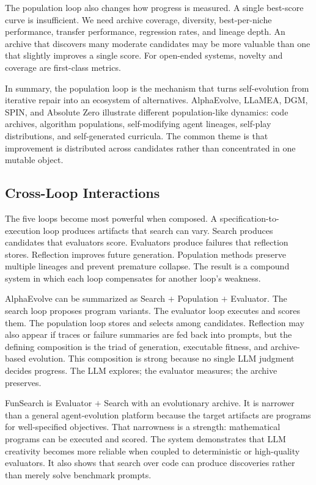 The population loop also changes how progress is measured.  A single best-score curve is insufficient.  We need archive coverage, diversity, best-per-niche performance, transfer performance, regression rates, and lineage depth.  An archive that discovers many moderate candidates may be more valuable than one that slightly improves a single score.  For open-ended systems, novelty and coverage are first-class metrics.

In summary, the population loop is the mechanism that turns self-evolution from iterative repair into an ecosystem of alternatives.  AlphaEvolve, LLaMEA, DGM, SPIN, and Absolute Zero illustrate different population-like dynamics: code archives, algorithm populations, self-modifying agent lineages, self-play distributions, and self-generated curricula.  The common theme is that improvement is distributed across candidates rather than concentrated in one mutable object.

\subsection{Cross-Loop Interactions}
\label{subsec:taxonomy-cross-loop}

The five loops become most powerful when composed.  A specification-to-execution loop produces artifacts that search can vary.  Search produces candidates that evaluators score.  Evaluators produce failures that reflection stores.  Reflection improves future generation.  Population methods preserve multiple lineages and prevent premature collapse.  The result is a compound system in which each loop compensates for another loop's weakness.

AlphaEvolve can be summarized as Search $+$ Population $+$ Evaluator.  The search loop proposes program variants.  The evaluator loop executes and scores them.  The population loop stores and selects among candidates.  Reflection may also appear if traces or failure summaries are fed back into prompts, but the defining composition is the triad of generation, executable fitness, and archive-based evolution.  This composition is strong because no single LLM judgment decides progress.  The LLM explores; the evaluator measures; the archive preserves.

FunSearch is Evaluator $+$ Search with an evolutionary archive.  It is narrower than a general agent-evolution platform because the target artifacts are programs for well-specified objectives.  That narrowness is a strength: mathematical programs can be executed and scored.  The system demonstrates that LLM creativity becomes more reliable when coupled to deterministic or high-quality evaluators.  It also shows that search over code can produce discoveries rather than merely solve benchmark prompts.

